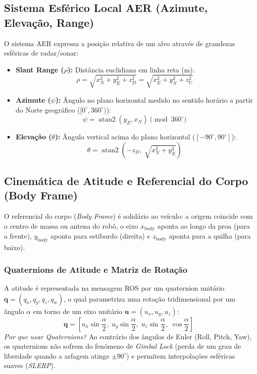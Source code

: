 \documentclass[11pt,a4paper]{article}
\begin{document}
\subsection{Sistema Esférico Local AER (Azimute, Elevação, Range)}
O sistema AER expressa a posição relativa de um alvo através de grandezas esféricas de radar/sonar:
\begin{itemize}
    \item \textbf{Slant Range ($\rho$):} Distância euclidiana em linha reta (m):
    \begin{equation}
        \rho = \sqrt{x_N^2 + y_E^2 + z_D^2} = \sqrt{x_E^2 + y_N^2 + z_U^2}
    \end{equation}
    \item \textbf{Azimute ($\psi$):} Ângulo no plano horizontal medido no sentido horário a partir do Norte geográfico ($[0^\circ, 360^\circ)$):
    \begin{equation}
        \psi = \operatorname{atan2}(y_E, x_N) \pmod{360^\circ}
    \end{equation}
    \item \textbf{Elevação ($\theta$):} Ângulo vertical acima do plano horizontal ($[-90^\circ, 90^\circ]$):
    \begin{equation}
        \theta = \operatorname{atan2}\left(-z_D, \; \sqrt{x_N^2 + y_E^2}\right)
    \end{equation}
\end{itemize}

\subsection{Cinemática de Atitude e Referencial do Corpo (Body Frame)}
O referencial do corpo (\textit{Body Frame}) é solidário ao veículo: a origem coincide com o centro de massa ou antena do robô, o eixo $x_{\text{body}}$ aponta ao longo da proa (para a frente), $y_{\text{body}}$ aponta para estibordo (direita) e $z_{\text{body}}$ aponta para a quilha (para baixo).

\subsubsection{Quaternions de Atitude e Matriz de Rotação}
A atitude é representada na mensagem ROS por um quaternion unitário $\mathbf{q} = (q_x, q_y, q_z, q_w)$, o qual parametriza uma rotação tridimensional por um ângulo $\alpha$ em torno de um eixo unitário $\mathbf{u} = (u_x, u_y, u_z)$:
\begin{equation}
    \mathbf{q} = \left[ u_x \sin\frac{\alpha}{2}, \; u_y \sin\frac{\alpha}{2}, \; u_z \sin\frac{\alpha}{2}, \; \cos\frac{\alpha}{2} \right]
\end{equation}
\textit{Por que usar Quaternions?} Ao contrário dos ângulos de Euler (Roll, Pitch, Yaw), os quaternions não sofrem do fenómeno de \textit{Gimbal Lock} (perda de um grau de liberdade quando a arfagem atinge $\pm 90^\circ$) e permitem interpolações esféricas suaves (\textit{SLERP}).
\end{document}
